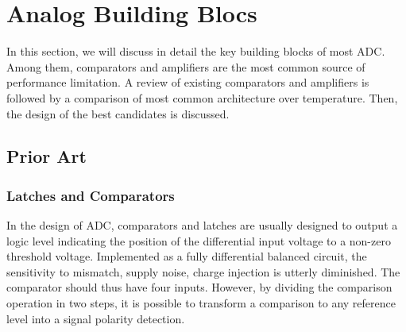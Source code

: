\chapter{Analog Building Blocs}
\label{sec:analog-building-bloc}

\ifpdf
    \graphicspath{{Chapter7/Figs/Raster/}{Chapter7/Figs/PDF/}{Chapter4/Figs/}}
\else
    \graphicspath{{Chapter7/Figs/Vector/}{Chapter7/Figs/}}
\fi 

In this section, we will discuss in detail the key building blocks of most ADC\@. Among them, comparators and amplifiers are the most common source of performance limitation. A review of existing comparators and amplifiers is followed by a comparison of most common architecture over temperature. Then, the design of the best candidates is discussed.

\section{Prior Art}                              %
    \subsection{Latches and Comparators}         %
    \label{sec:latches}
In the design of ADC, comparators and latches are usually designed to output a logic level indicating the position of the differential input voltage to a non-zero threshold voltage. Implemented as a fully differential balanced circuit, the sensitivity to mismatch, supply noise, charge injection is utterly diminished. The comparator should thus have four inputs. However, by dividing the comparison operation in two steps, it is possible to transform a comparison to any reference level into a signal polarity detection.

